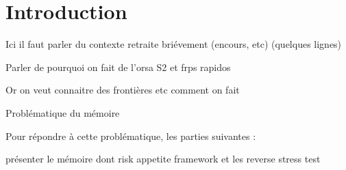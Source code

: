 \chapter*{Introduction}


Ici il faut parler du contexte retraite briévement (encours, etc) (quelques lignes) 

Parler de pourquoi on fait de l'orsa S2 et frps rapidos

Or on veut connaitre des frontières etc comment on fait

Problématique du mémoire 

Pour répondre à cette problématique, les parties suivantes :

présenter le mémoire dont risk appetite framework et les reverse stress test